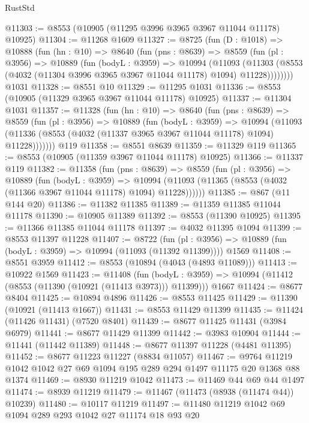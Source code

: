 \begin{lexlean}{RustStd}
\begin{coremodule}
@11303 := @8553 (@10905 (@11295 @3996 @3965 @3967 @11044 @11178) @10925)
@11304 := @11268 @1609
@11327 := @8725
    (fun (D : @1018) =>
    @10888
      (fun (hn : @10) =>
      @8640
        (fun (pns : @8639) =>
        @8559
          (fun (pl : @3956) =>
          @10889
            (fun (bodyL : @3959) =>
            @10994
              (@11093
                (@11303 (@8553 (@4032 (@11304 @3996 @3965 @3967 @11044 @11178) @1094) @11228))))))))
    @1031
@11328 := @8551 @10
@11329 := @11295 @1031
@11336 := @8553 (@10905 (@11329 @3965 @3967 @11044 @11178) @10925)
@11337 := @11304 @1031
@11357 := @11328
    (fun (hn : @10) =>
    @8640
      (fun (pns : @8639) =>
      @8559
        (fun (pl : @3956) =>
        @10889
          (fun (bodyL : @3959) =>
          @10994
            (@11093 (@11336 (@8553 (@4032 (@11337 @3965 @3967 @11044 @11178) @1094) @11228)))))))
    @119
@11358 := @8551 @8639
@11359 := @11329 @119
@11365 := @8553 (@10905 (@11359 @3967 @11044 @11178) @10925)
@11366 := @11337 @119
@11382 := @11358
    (fun (pns : @8639) =>
    @8559
      (fun (pl : @3956) =>
      @10889
        (fun (bodyL : @3959) =>
        @10994 (@11093 (@11365 (@8553 (@4032 (@11366 @3967 @11044 @11178) @1094) @11228))))))
@11385 := @867 (@11 @144 @20)
@11386 := @11382 @11385
@11389 := @11359 @11385 @11044 @11178
@11390 := @10905 @11389
@11392 := @8553 (@11390 @10925)
@11395 := @11366 @11385 @11044 @11178
@11397 := @4032 @11395 @1094
@11399 := @8553 @11397 @11228
@11407 := @8722
    (fun (pl : @3956) => @10889 (fun (bodyL : @3959) => @10994 (@11093 (@11392 @11399))))
    @1569
@11408 := @8551 @3959
@11412 := @8553 (@10894 (@4043 (@4893 @11089)))
@11413 := @10922 @1569
@11423 := @11408
    (fun (bodyL : @3959) => @10994 (@11412 (@8553 (@11390 (@10921 (@11413 @3973))) @11399)))
    @1667
@11424 := @8677 @8404
@11425 := @10894 @4896
@11426 := @8553 @11425
@11429 := @11390 (@10921 (@11413 @1667))
@11431 := @8553 @11429 @11399
@11435 := @11424 (@11426 @11431) (@7520 @8401)
@11439 := @8677 @11425 @11431 (@3984 @6979)
@11441 := @8677 @11429 @11399
@11442 := @3983 @10904
@11444 := @11441 (@11442 @11389)
@11448 := @8677 @11397 @11228 (@4481 @11395)
@11452 := @8677 @11223 @11227 (@8834 @11057)
@11467 := @9764 @11219 @1042 @1042 @27 @69 @1094 @195 @289 @294 @1497 @11175 @20 @1368 @88 @1374
@11469 := @8930 @11219 @1042
@11473 := @11469 @44 @69 @44 @1497
@11474 := @8939 @11219
@11479 := @11467 (@11473 (@8938 (@11474 @44)) @10239)
@11480 := @10117 @11219
@11497 := @11480
    @11219
    @1042
    @69
    @1094
    @289
    @293
    @1042
    @27
    @11174
    @18
    @93
    @20

\end{coremodule}
\end{lexlean}
